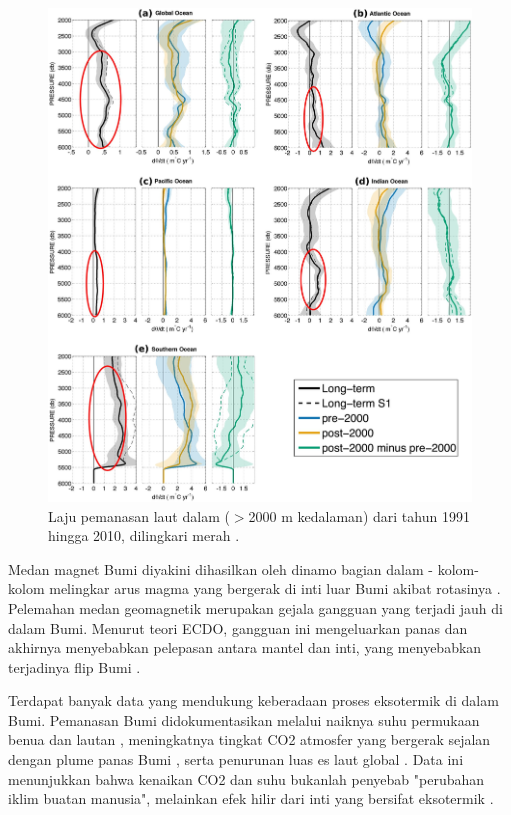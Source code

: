 \documentclass[10pt,twocolumn,letterpaper]{article}
\begin{document}
\begin{figure}[t]
\begin{center}
   \includegraphics[width=1\linewidth]{ocean-highlight.jpg}
\end{center}
   \caption{Laju pemanasan laut dalam ($>$2000 m kedalaman) dari tahun 1991 hingga 2010, dilingkari merah \cite{132}.}
\label{fig:15}
\label{fig:onecol}
\end{figure}

Medan magnet Bumi diyakini dihasilkan oleh dinamo bagian dalam - kolom-kolom melingkar arus magma yang bergerak di inti luar Bumi akibat rotasinya \cite{123}. Pelemahan medan geomagnetik merupakan gejala gangguan yang terjadi jauh di dalam Bumi. Menurut teori ECDO, gangguan ini mengeluarkan panas dan akhirnya menyebabkan pelepasan antara mantel dan inti, yang menyebabkan terjadinya flip Bumi \cite{1}.

Terdapat banyak data yang mendukung keberadaan proses eksotermik di dalam Bumi. Pemanasan Bumi didokumentasikan melalui naiknya suhu permukaan benua dan lautan \cite{127,128}, meningkatnya tingkat CO2 atmosfer yang bergerak sejalan dengan plume panas Bumi \cite{129,130}, serta penurunan luas es laut global \cite{131}. Data ini menunjukkan bahwa kenaikan CO2 dan suhu bukanlah penyebab "perubahan iklim buatan manusia", melainkan efek hilir dari inti yang bersifat eksotermik \cite{129}.
\end{document}
